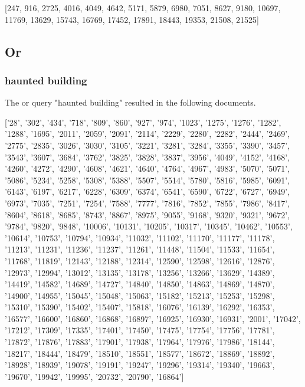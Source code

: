 \begin{center}
    [247, 916, 2725, 4016, 4049, 4642, 5171, 5879, 6980, 7051, 8627, 9180, 10697, 11769, 13629, 15743, 16769, 17452, 17891, 18443, 19353, 21508, 21525]
\end{center}

\subsection{Or}

\subsubsection{haunted building}

\par The or query "haunted building" resulted in the following documents.
\begin{center}
    ['28', '302', '434', '718', '809', '860', '927', '974', '1023', '1275', '1276', '1282', '1288', '1695', '2011', '2059', '2091', '2114', '2229', '2280', '2282', '2444', '2469', '2775', '2835', '3026', '3030', '3105', '3221', '3281', '3284', '3355', '3390', '3457', '3543', '3607', '3684', '3762', '3825', '3828', '3837', '3956', '4049', '4152', '4168', '4260', '4272', '4290', '4608', '4621', '4640', '4764', '4967', '4983', '5070', '5071', '5086', '5234', '5258', '5308', '5388', '5507', '5514', '5780', '5816', '5985', '6091', '6143', '6197', '6217', '6228', '6309', '6374', '6541', '6590', '6722', '6727', '6949', '6973', '7035', '7251', '7254', '7588', '7777', '7816', '7852', '7855', '7986', '8417', '8604', '8618', '8685', '8743', '8867', '8975', '9055', '9168', '9320', '9321', '9672', '9784', '9820', '9848', '10006', '10131', '10205', '10317', '10345', '10462', '10553', '10614', '10753', '10794', '10934', '11032', '11102', '11170', '11177', '11178', '11213', '11231', '11236', '11237', '11261', '11448', '11504', '11533', '11654', '11768', '11819', '12143', '12188', '12314', '12590', '12598', '12616', '12876', '12973', '12994', '13012', '13135', '13178', '13256', '13266', '13629', '14389', '14419', '14582', '14689', '14727', '14840', '14850', '14863', '14869', '14870', '14900', '14955', '15045', '15048', '15063', '15182', '15213', '15253', '15298', '15310', '15390', '15402', '15407', '15818', '16076', '16139', '16292', '16353', '16577', '16600', '16860', '16868', '16897', '16925', '16930', '16931', '2001', '17042', '17212', '17309', '17335', '17401', '17450', '17475', '17754', '17756', '17781', '17872', '17876', '17883', '17901', '17938', '17964', '17976', '17986', '18144', '18217', '18444', '18479', '18510', '18551', '18577', '18672', '18869', '18892', '18928', '18939', '19078', '19191', '19247', '19296', '19314', '19340', '19663', '19670', '19942', '19995', '20732', '20790', '16864']
\end{center}

